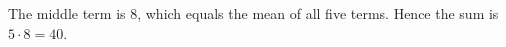 The middle term is 8, which equals the mean of all five terms. Hence the sum is $5\cdot8=\boxed{40}$.
